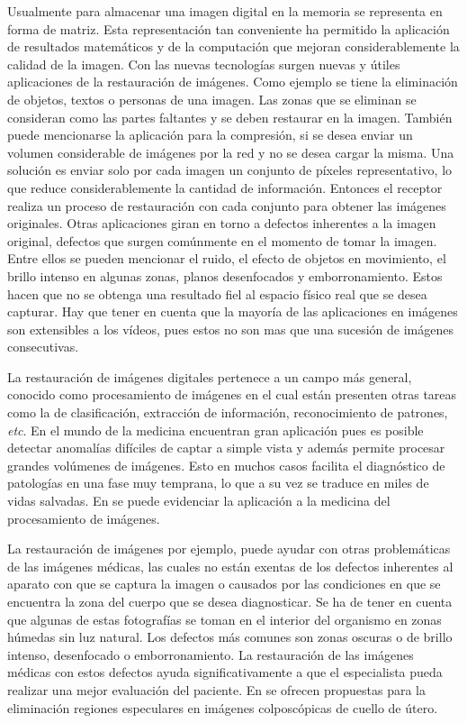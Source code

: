 Usualmente para almacenar una imagen digital en la memoria se representa en forma de matriz. Esta representaci\'on tan conveniente ha permitido la aplicaci\'on de resultados matem\'aticos y de la computaci\'on que mejoran considerablemente la calidad de la imagen. Con las nuevas tecnolog\'ias surgen nuevas y \'utiles aplicaciones de la restauraci\'on de im\'agenes. Como ejemplo se tiene la eliminaci\'on de objetos, textos o personas de una imagen. Las zonas que se eliminan se consideran como las partes faltantes y se deben restaurar en la imagen. También puede mencionarse la aplicaci\'on para la compresi\'on, si se desea enviar un volumen considerable de imágenes por la red y no se desea cargar la misma. Una solución es enviar solo por cada imagen un conjunto de p\'ixeles representativo, lo que reduce considerablemente la cantidad de informaci\'on. Entonces el receptor realiza un proceso de restauraci\'on con cada conjunto para obtener las imágenes originales. Otras aplicaciones giran en torno a defectos inherentes a la imagen original, defectos que surgen comúnmente en el momento de tomar la imagen. Entre ellos se pueden mencionar el ruido, el efecto de objetos en movimiento, el brillo intenso en algunas zonas, planos desenfocados y emborronamiento. Estos hacen que no se obtenga una resultado fiel al espacio físico real que se desea capturar. Hay que tener en cuenta que la mayor\'ia de las aplicaciones en im\'agenes son extensibles a los vídeos, pues estos no son mas que una sucesión de imágenes consecutivas.

La restauraci\'on de im\'agenes digitales pertenece a un campo m\'as general, conocido como procesamiento de im\'agenes en el cual est\'an presenten otras tareas como la de clasificaci\'on, extracci\'on de informaci\'on, reconocimiento de patrones, \textit{etc}. En el mundo de la medicina encuentran gran aplicaci\'on pues es posible detectar anomalías difíciles de captar a simple vista y adem\'as permite procesar grandes volúmenes de imágenes. Esto en muchos casos facilita el diagn\'ostico de patologías en una fase muy temprana, lo que a su vez se traduce en miles de vidas salvadas. En \cite{afals2016tesis} se puede evidenciar la aplicaci\'on a la medicina del procesamiento de im\'agenes.

La restauraci\'on de im\'agenes por ejemplo, puede ayudar con otras problemáticas de las im\'agenes m\'edicas, las cuales no est\'an exentas de los defectos inherentes al aparato con que se captura la imagen o causados por las condiciones en que se encuentra la zona del cuerpo que se desea diagnosticar. Se ha de tener en cuenta que algunas de estas fotograf\'ias se toman en el interior del organismo en zonas h\'umedas sin luz natural. Los defectos m\'as comunes son zonas oscuras o de brillo intenso, desenfocado o emborronamiento. La restauración de las imágenes médicas con estos defectos ayuda significativamente a que el especialista pueda realizar una mejor evaluación del paciente. En \cite{dgomez2018tesis,apalmer2015tesis} se ofrecen propuestas para la eliminaci\'on regiones especulares en imágenes colposcópicas de cuello de útero.

